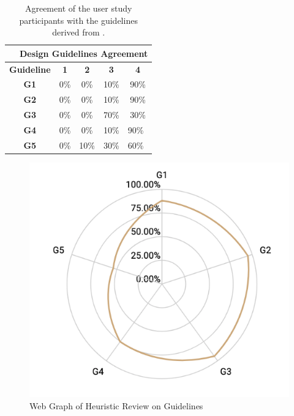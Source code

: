 \documentclass{sigchi}
\begin{document}
\begin{table}[h]
\centering
\begin{tabular}{ccccc}
\multicolumn{5}{r}{\textbf{Design Guidelines Agreement}} \\ \hline
\textbf{Guideline} & \textbf{1} & \textbf{2} & \textbf{3} & \textbf{4} \\ \hline
\textbf{G1} & 0\% & 0\% & 10\% & 90\% \\
\textbf{G2} & 0\% & 0\% & 10\% & 90\% \\
\textbf{G3} & 0\% & 0\% & 70\% & 30\% \\
\textbf{G4} & 0\% & 0\% & 10\% & 90\%\ \\
\textbf{G5} & 0\% & 10\% & 30\% & 60\%\ \\ \hline
\end{tabular}
\caption{Agreement of the user study participants with the guidelines derived from \protect \cite{amershi2011designing}.}
\label{tab:us_guidelines}
\end{table}



\begin{figure}[h]
    \centering
    \includegraphics[width = 1 \columnwidth]{figures/guidelinereview.png}
    \caption{Web Graph of Heuristic Review on Guidelines}
    \label{fig:guidelinereview}
\end{figure}
\end{document}
